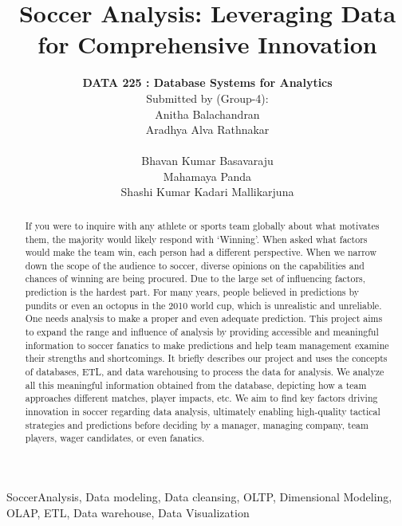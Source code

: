 \documentclass[lettersize]{IEEEtran}
\begin{document}
\title{Soccer Analysis: Leveraging Data for Comprehensive Innovation}
\author{\textbf{DATA 225 : Database Systems for Analytics} \\ {Submitted by (Group-4): } \\ Anitha Balachandran \\ Aradhya Alva Rathnakar \\ \\ Bhavan Kumar Basavaraju \\ Mahamaya Panda \\ Shashi Kumar Kadari Mallikarjuna}

\maketitle

\begin{abstract}
If you were to inquire with any athlete or sports team globally about what motivates them, the majority would likely respond with ‘Winning’. When asked what factors would make the team win, each person had a different perspective. When we narrow down the scope of the audience to soccer, diverse opinions on the capabilities and chances of winning are being procured. Due to the large set of influencing factors, prediction is the hardest part. For many years, people believed in predictions by pundits or even an octopus in the 2010 world cup, which is unrealistic and unreliable. One needs analysis to make a proper and even adequate prediction. This project aims to expand the range and influence of analysis by providing accessible and meaningful information to soccer fanatics to make predictions and help team management examine their strengths and shortcomings. It briefly describes our project and uses the concepts of databases, ETL, and data warehousing to process the data for analysis. We analyze all this meaningful information obtained from the database, depicting how a team approaches different matches, player impacts, etc. We aim to find key factors driving innovation in soccer regarding data analysis, ultimately enabling high-quality tactical strategies and predictions before deciding by a manager, managing company, team players, wager candidates, or even fanatics.
\end{abstract}

\begin{IEEEkeywords}
SoccerAnalysis, Data modeling, Data cleansing, OLTP, Dimensional Modeling, OLAP, ETL, Data warehouse, Data Visualization
\end{IEEEkeywords}
\end{document}
